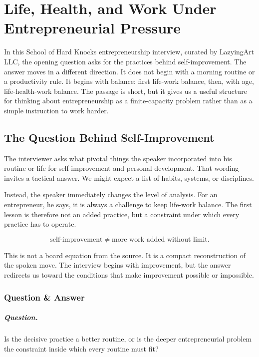 \chapter{Life, Health, and Work Under Entrepreneurial Pressure}

In this School of Hard Knocks entrepreneurship interview, curated by LazyingArt LLC, the opening question asks for the practices behind self-improvement. The answer moves in a different direction. It does not begin with a morning routine or a productivity rule. It begins with balance: first life-work balance, then, with age, life-health-work balance. The passage is short, but it gives us a useful structure for thinking about entrepreneurship as a finite-capacity problem rather than as a simple instruction to work harder.

\section{The Question Behind Self-Improvement}

The interviewer asks what pivotal things the speaker incorporated into his routine or life for self-improvement and personal development. That wording invites a tactical answer. We might expect a list of habits, systems, or disciplines.

Instead, the speaker immediately changes the level of analysis. For an entrepreneur, he says, it is always a challenge to keep life-work balance. The first lesson is therefore not an added practice, but a constraint under which every practice has to operate.

\begin{equation}
\text{self-improvement}
\neq
\text{more work added without limit}.
\end{equation}

This is not a board equation from the source. It is a compact reconstruction of the spoken move. The interview begins with improvement, but the answer redirects us toward the conditions that make improvement possible or impossible.

\subsection{Question \& Answer}

\paragraph{Question.}
Is the decisive practice a better routine, or is the deeper entrepreneurial problem the constraint inside which every routine must fit?

